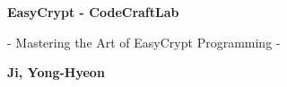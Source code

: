\begin{titlepage}
    \centering
    
    \vspace*{1cm}
    
    \Huge\textsf{\textbf{EasyCrypt - CodeCraftLab}}
    
    \vspace{0.5cm}
    \LARGE\textsf{- Mastering the Art of EasyCrypt Programming -}
    
    \vspace{1.5cm}
    \textbf{Ji, Yong-Hyeon}

	\vspace{2cm}
%		
%		
%		
%		
%		
%		
%		
%		
%		
%		
	

\end{titlepage}
